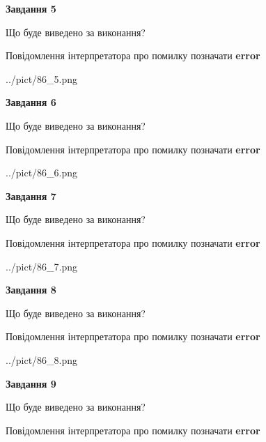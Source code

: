 \documentclass[11pt, ukrainian]{article}
\begin{document}
{\begin {large}
{\begin {center}\textbf{Завдання 5}\end {center}}\par
Що буде виведено за виконання? \par
Повідомлення інтерпретатора про помилку позначати \textbf{error}

\begin{center}
	{../pict/86_5.png}
\end{center}
\newpage

{\begin {center}\textbf{Завдання 6}\end {center}}\par
Що буде виведено за виконання? \par
Повідомлення інтерпретатора про помилку позначати \textbf{error}

\begin{center}
	{../pict/86_6.png}
\end{center}
\newpage

{\begin {center}\textbf{Завдання 7}\end {center}}\par
Що буде виведено за виконання? \par
Повідомлення інтерпретатора про помилку позначати \textbf{error}

\begin{center}
	{../pict/86_7.png}
\end{center}
\newpage

{\begin {center}\textbf{Завдання 8}\end {center}}\par
Що буде виведено за виконання? \par
Повідомлення інтерпретатора про помилку позначати \textbf{error}

\begin{center}
	{../pict/86_8.png}
\end{center}
\newpage

{\begin {center}\textbf{Завдання 9}\end {center}}\par
Що буде виведено за виконання? \par
Повідомлення інтерпретатора про помилку позначати \textbf{error}


\end{large}}
\end{document}
